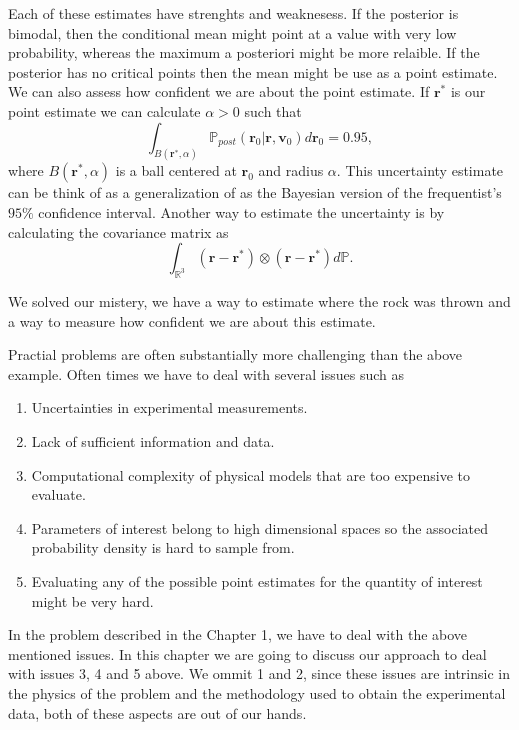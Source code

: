 \documentclass[12pt]{book}
\newcommand{\post}{\mathbb{P}_{post}}
\newcommand{\p}{\mathbb{P}}
\begin{document}
Each  of these estimates have strenghts and weaknesess. If the posterior is bimodal, then the conditional
mean might point at a value with very low probability, whereas the maximum a posteriori might be more 
relaible. If the posterior has no critical points then the mean might be use as a point estimate. We can 
also assess how confident we are about the point estimate. If $\textbf{r}^{*}$ is our point
estimate we can calculate $\alpha>0$ such that
\begin{equation*}
\int_{B(\textbf{r}^{*},\alpha)}\post(\textbf{r}_{0}|\textbf{r},\textbf{v}_{0})d\textbf{r}_{0}=0.95,
\end{equation*}
where $B(\textbf{r}^{*},\alpha)$ is a ball centered at $\textbf{r}_{0}$ and radius $\alpha$. This 
uncertainty estimate can be think of as a generalization of as the Bayesian version 
of the frequentist's $95\%$ confidence interval.
Another way to estimate the uncertainty is by calculating the covariance matrix as
\begin{equation*}
\int_{\mathbb{R}^{3}}(\textbf{r}-\textbf{r}^{*})\otimes(\textbf{r}-\textbf{r}^{*})d\p.
\end{equation*}
\newline

We solved our mistery, we have a way to estimate where the rock was thrown and a way to measure how
confident we are about this estimate. 
\newline


Practial problems are often substantially more challenging than the above example. Often times we have to 
deal with several issues such as 

\begin{enumerate}
\item Uncertainties in experimental measurements.
\item Lack of sufficient information and data.
\item Computational complexity of  physical models that are too expensive to evaluate.
\item Parameters of interest belong to high dimensional spaces so the associated probability density is 
hard to sample from.
\item Evaluating any of the possible point estimates for the quantity of interest might be very hard.
\end{enumerate}
In the problem described in the Chapter 1, we have to deal with the above mentioned issues.
In this chapter we are going to discuss our approach to deal with issues 3, 4 and 5 above. We 
ommit 1 and 2, since these issues are intrinsic in the physics of the problem and   the methodology used 
to obtain the experimental data, both of these aspects are out of our hands.
\end{document}

